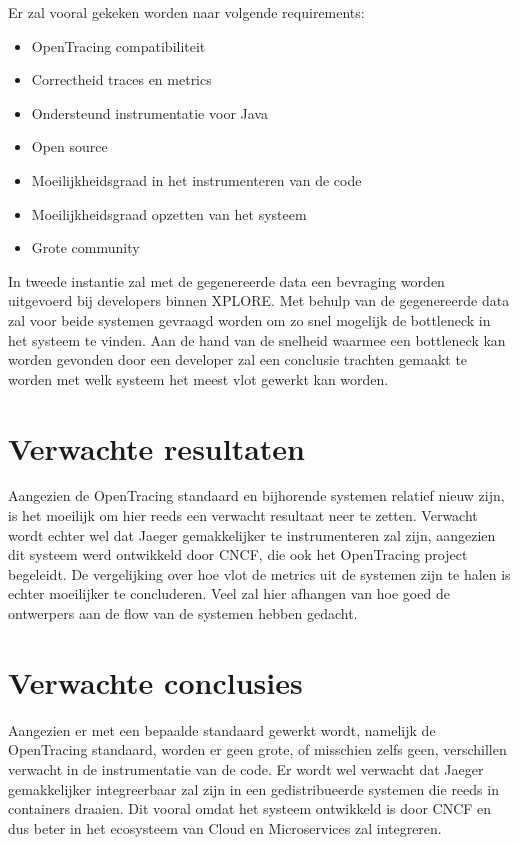 Er zal vooral gekeken worden naar volgende requirements:
\begin{itemize}
	\item OpenTracing compatibiliteit
	\item Correctheid traces en metrics
	\item Ondersteund instrumentatie voor Java
	\item Open source
	\item Moeilijkheidsgraad in het instrumenteren van de code
	\item Moeilijkheidsgraad opzetten van het systeem
	\item Grote community
\end{itemize}

In tweede instantie zal met de gegenereerde data een bevraging worden uitgevoerd bij developers binnen XPLORE. Met behulp van de gegenereerde data zal voor beide systemen gevraagd worden om zo snel mogelijk de bottleneck in het systeem te vinden. Aan de hand van de snelheid waarmee een bottleneck kan worden gevonden door een developer zal een conclusie trachten gemaakt te worden met welk systeem het meest vlot gewerkt kan worden.

\section{Verwachte resultaten}
\label{sec:verwachte_resultaten}

Aangezien de OpenTracing standaard en bijhorende systemen relatief nieuw zijn, is het moeilijk om hier reeds een verwacht resultaat neer te zetten. Verwacht wordt echter wel dat Jaeger gemakkelijker te instrumenteren zal zijn, aangezien dit systeem werd ontwikkeld door \gls{CNCF}, die ook het OpenTracing project begeleidt. De vergelijking over hoe vlot de metrics uit de systemen zijn te halen is echter moeilijker te concluderen. Veel zal hier afhangen van hoe goed de ontwerpers aan de flow van de systemen hebben gedacht.

\section{Verwachte conclusies}
\label{sec:verwachte_conclusies}

Aangezien er met een bepaalde standaard gewerkt wordt, namelijk de OpenTracing standaard, worden er geen grote, of misschien zelfs geen, verschillen verwacht in de instrumentatie van de code. Er wordt wel verwacht dat Jaeger gemakkelijker integreerbaar zal zijn in een gedistribueerde systemen die reeds in containers draaien. Dit vooral omdat het systeem ontwikkeld is door \gls{CNCF} en dus beter in het ecosysteem van Cloud en Microservices zal integreren.

